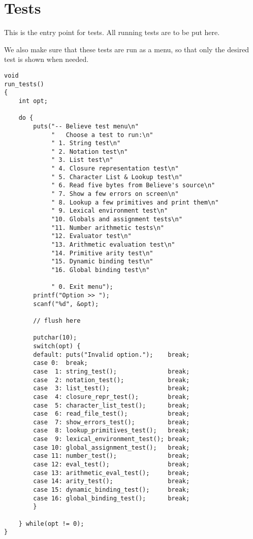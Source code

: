 \documentclass[openright,a4paper,twoside,12pt]{memoir}
\begin{document}
\section{Tests}
\label{sec:org9c021f5}

This is the entry point for tests. All running tests are to be put
here.

We also make sure that these tests are run as a menu, so that only the
desired test is shown when needed.

\begin{verbatim}
void
run_tests()
{
    int opt;

    do {
        puts("-- Believe test menu\n"
             "   Choose a test to run:\n"
             " 1. String test\n"
             " 2. Notation test\n"
             " 3. List test\n"
             " 4. Closure representation test\n"
             " 5. Character List & Lookup test\n"
             " 6. Read five bytes from Believe's source\n"
             " 7. Show a few errors on screen\n"
             " 8. Lookup a few primitives and print them\n"
             " 9. Lexical environment test\n"
             "10. Globals and assignment tests\n"
             "11. Number arithmetic tests\n"
             "12. Evaluator test\n"
             "13. Arithmetic evaluation test\n"
             "14. Primitive arity test\n"
             "15. Dynamic binding test\n"
             "16. Global binding test\n"
             
             " 0. Exit menu");
        printf("Option >> ");
        scanf("%d", &opt);

        // flush here

        putchar(10);
        switch(opt) {
        default: puts("Invalid option.");    break;
        case 0:  break;
        case  1: string_test();              break;
        case  2: notation_test();            break;
        case  3: list_test();                break;
        case  4: closure_repr_test();        break;
        case  5: character_list_test();      break;
        case  6: read_file_test();           break;
        case  7: show_errors_test();         break;
        case  8: lookup_primitives_test();   break;
        case  9: lexical_environment_test(); break;
        case 10: global_assignment_test();   break;
        case 11: number_test();              break;
        case 12: eval_test();                break;
        case 13: arithmetic_eval_test();     break;
        case 14: arity_test();               break;
        case 15: dynamic_binding_test();     break;
        case 16: global_binding_test();      break;
        }
        
    } while(opt != 0);
}
\end{verbatim}
\end{document}
